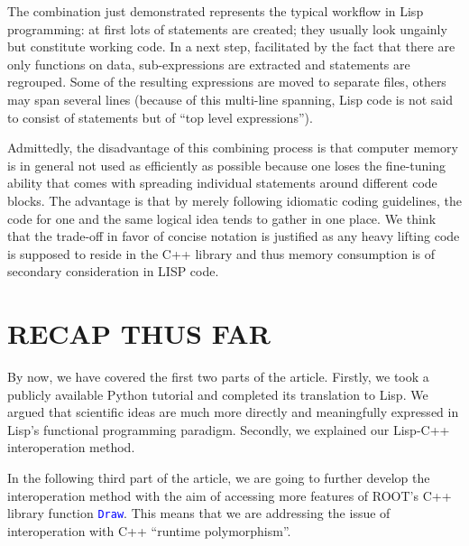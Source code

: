 \documentclass[twocolumn]{article}
\begin{document}
The combination just demonstrated represents the typical workflow in Lisp programming: at first lots of statements are created; they usually look ungainly but constitute working code. In a next step, facilitated by the fact that there are only functions on data, sub-expressions are extracted and statements are regrouped. Some of the resulting expressions are moved to separate files, others may span several lines (because of this multi-line spanning, Lisp code is not said to consist of statements but of “top level expressions”).

Admittedly, the disadvantage of this combining process is that computer memory is in general not used as efficiently as possible because one loses the fine-tuning ability that comes with spreading individual statements around different code blocks. The advantage is that by merely following idiomatic coding guidelines, the code for one and the same logical idea tends to gather in one place. We think that the trade-off in favor of concise notation is justified as any heavy lifting code is supposed to reside in the C++ library and thus memory consumption is of secondary consideration in LISP code.

\section{RECAP THUS FAR}
By now, we have covered the first two parts of the article. Firstly, we took a publicly available Python tutorial and completed its translation to Lisp. We argued that scientific ideas are much more directly and meaningfully expressed in Lisp’s functional programming paradigm. Secondly, we explained our Lisp-C++ interoperation method.

In the following third part of the article, we are going to further develop the interoperation method with the aim of accessing more features of ROOT’s C++ library function \texttt{\textcolor{blue}{Draw}}. This means that we are addressing the issue of interoperation with C++ “runtime polymorphism”.
\end{document}
